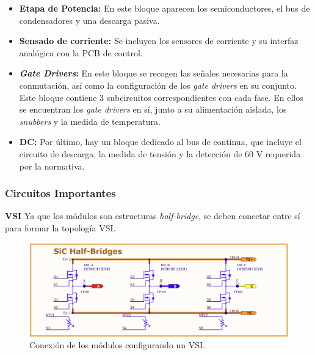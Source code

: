 \begin{itemize}
	
	\item \textbf{Etapa de Potencia:} En este bloque aparecen los semiconductores, el bus de condensadores y una descarga pasiva.
	
	\item \textbf{Sensado de corriente:} Se incluyen los sensores de corriente y su interfaz analógica con la PCB de control.
			
	\item \textbf{\textit{Gate Drivers}:} En este bloque se recogen las señales necesarias para la conmutación, así como la configuración de los \textit{gate drivers} en su conjunto. Este bloque contiene 3 subcircuitos correspondientes con cada fase. En ellos se encuentran los \textit{gate drivers} en sí, junto a su alimentación aislada, los \textit{snubbers} y la medida de temperatura.
		
	\item \textbf{DC:} Por último, hay un bloque dedicado al bus de continua, que incluye el circuito de descarga, la medida de tensión y la detección de 60 V requerida por la normativa.
\end{itemize}

\subsubsection{Circuitos Importantes}

\textbf{VSI}
Ya que los módulos son estructuras \textit{half-bridge}, se deben conectar entre sí para formar la topología VSI.
\begin{figure}[H]
	\centering
	\includegraphics[width=0.7\linewidth]{fig/VSI-shc}
	\caption{Conexión de los módulos configurando un VSI.}
\end{figure}


